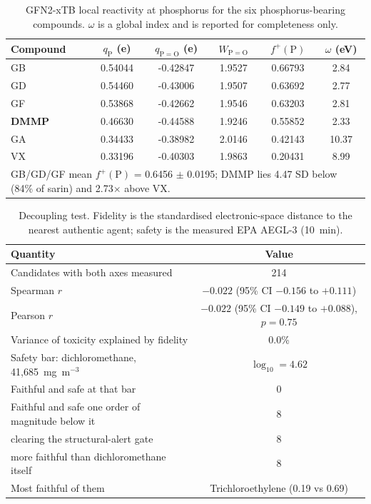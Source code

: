 \begin{table}[t]
\centering
\caption{GFN2-xTB local reactivity at phosphorus for the six phosphorus-bearing
compounds. $\omega$ is a global index and is reported for completeness only.}
\label{tab:plocal}
\begin{tabular}{lccccc}
\hline
Compound & $q_{\mathrm{P}}$ (e) & $q_{\mathrm{P=O}}$ (e) & $W_{\mathrm{P=O}}$ &
$f^{+}(\mathrm{P})$ & $\omega$ (eV) \\
\hline
GB & 0.54044 & -0.42847 & 1.9527 & 0.66793 & 2.84 \\
GD & 0.54460 & -0.43006 & 1.9507 & 0.63692 & 2.77 \\
GF & 0.53868 & -0.42662 & 1.9546 & 0.63203 & 2.81 \\
\textbf{DMMP} & 0.46630 & -0.44588 & 1.9246 & 0.55852 & 2.33 \\
GA & 0.34433 & -0.38982 & 2.0146 & 0.42143 & 10.37 \\
VX & 0.33196 & -0.40303 & 1.9863 & 0.20431 & 8.99 \\
\hline
\multicolumn{6}{l}{\footnotesize GB/GD/GF mean $f^{+}(\mathrm{P})$ = 0.6456 $\pm$ 0.0195;
DMMP lies 4.47 SD below (84\% of sarin) and 2.73$\times$ above VX.}\\
\end{tabular}
\end{table}

\begin{table}[t]
\centering
\caption{Decoupling test. Fidelity is the standardised electronic-space distance to
the nearest authentic agent; safety is the measured EPA AEGL-3 (10~min).}
\label{tab:h1}
\begin{tabular}{lc}
\hline
Quantity & Value \\
\hline
Candidates with both axes measured & 214 \\
Spearman $r$ & $-0.022$ (95\% CI $-0.156$ to $+0.111$) \\
Pearson $r$ & $-0.022$ (95\% CI $-0.149$ to $+0.088$), $p = 0.75$ \\
Variance of toxicity explained by fidelity & 0.0\% \\
\hline
Safety bar: dichloromethane, 41,685~mg~m$^{-3}$ & $\log_{10} = 4.62$ \\
Faithful and safe at that bar & 0 \\
Faithful and safe one order of magnitude below it & 8 \\
\quad clearing the structural-alert gate & 8 \\
\quad more faithful than dichloromethane itself & 8 \\
Most faithful of them & Trichloroethylene (0.19 vs 0.69) \\
\hline
\end{tabular}
\end{table}

